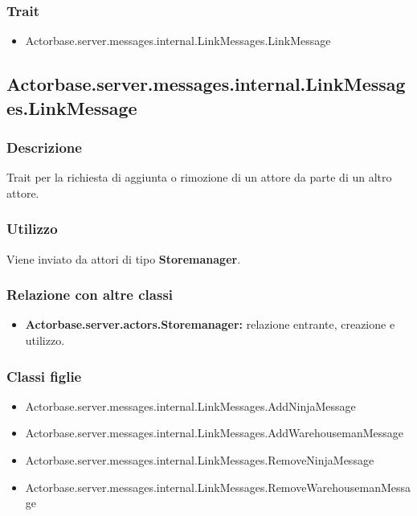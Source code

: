 \documentclass[a4paper]{article}
\begin{document}
			\subsubsection{Trait}
				\begin{itemize}
					\item Actorbase.server.messages.internal.LinkMessages.LinkMessage
				\end{itemize}
				
		\subsection{Actorbase.server.messages.internal.LinkMessages.LinkMessage}
			\subsubsection{Descrizione}
				Trait per la richiesta di aggiunta o rimozione di un attore da parte di un altro attore.
				
			\subsubsection{Utilizzo}
				Viene inviato da attori di tipo \textbf{Storemanager}.
				
			\subsubsection{Relazione con altre classi}
				\begin{itemize}
					\item \textbf{Actorbase.server.actors.Storemanager:} relazione entrante, creazione e utilizzo.
				\end{itemize}
				
			\subsubsection{Classi figlie}
				\begin{itemize}
					\item Actorbase.server.messages.internal.LinkMessages.AddNinjaMessage
					\item Actorbase.server.messages.internal.LinkMessages.AddWarehousemanMessage
					\item Actorbase.server.messages.internal.LinkMessages.RemoveNinjaMessage
					\item Actorbase.server.messages.internal.LinkMessages.RemoveWarehousemanMessage
				\end{itemize}
				
\end{document}
